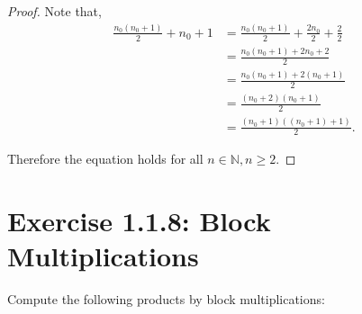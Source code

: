\documentclass{amsbook}
\theoremstyle{definition}
\theoremstyle{remark}
\numberwithin{section}{chapter}
\numberwithin{equation}{chapter}
\begin{document}
\begin{proof}
Note that,
\begin{equation*}
\begin{split}
\frac{n_0(n_0 + 1)}{2}+n_0+1&=\frac{n_0(n_0 + 1)}{2}+\frac{2n_0}{2}+\frac{2}{2}\\
&=\frac{n_0(n_0 + 1)+2n_0+2}{2}\\
&=\frac{n_0(n_0 + 1)+2(n_0+1)}{2}\\
&=\frac{(n_0+2)(n_0 + 1)}{2}\\
&=\frac{(n_0+1)((n_0 + 1) + 1)}{2}.
\end{split}
\end{equation*}

Therefore the equation holds for all $n\in\mathbb{N}, n\geq 2$.
\end{proof}

\section{Exercise 1.1.8: Block Multiplications}
Compute the following products by block multiplications:
\end{document}
